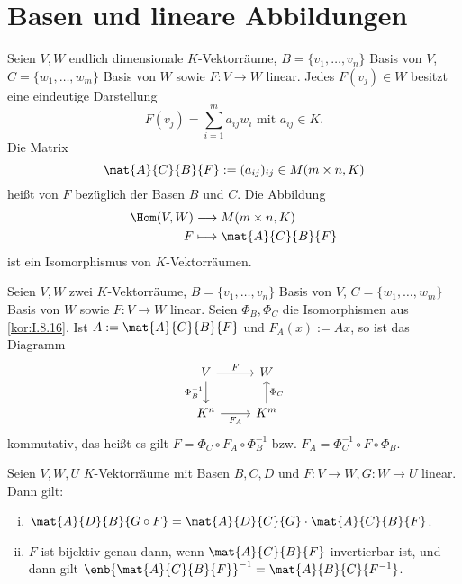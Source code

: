 \section{Basen und lineare Abbildungen}

\begin{satz}[Darstellungsmatrix]
	\label{satz:I.10.1}
	Seien $V,W$ endlich dimensionale $K$-Vektorräume, $B = \{v_1,\dots,v_n\}$ Basis von $V$, $C = \{w_1,\dots,w_m\}$ Basis von $W$ sowie $F \colon V \rightarrow W$ linear.
	Jedes $F(v_j) \in W$ besitzt eine eindeutige Darstellung
	\[
		F(v_j) = \sum_{i=1}^{m} a_{ij} w_i \text{ mit } a_{ij} \in K.
	\]
	Die Matrix
	\[
		\mat{A}{C}{B}{F} := (a_{ij})_{ij} \in M(m\times n,K)
	\]
	heißt  von $F$ bezüglich der Basen $B$ und $C$.
	Die Abbildung
	\begin{align*}
		\Hom(V,W) &\longrightarrow M(m \times n,K) \\
		F &\longmapsto \mat{A}{C}{B}{F}
	\end{align*}
	ist ein Isomorphismus von $K$-Vektorräumen.
\end{satz}

\setcounter{definition}{2}
\begin{lemma}
	\label{lemma:I.10.3}
	Seien $V,W$ zwei $K$-Vektorräume, $B = \{v_1,\dots,v_n\}$ Basis von $V$, $C = \{w_1,\dots,w_m\}$ Basis von $W$ sowie $F \colon V \rightarrow W$ linear.
	Seien $\Phi_B, \Phi_C$ die Isomorphismen aus \autoref{kor:I.8.16}.
	Ist $A := \mat{A}{C}{B}{F}$ und $F_A(x) := Ax$, so ist das Diagramm
	\[
		\begin{tikzcd}
			V \arrow[r,"F"] \arrow[d,"\Phi_B^{-1}"'] & W \\
			K^n \arrow[r,"F_A"'] & K^m \arrow[u,"\Phi_C"']
		\end{tikzcd}
	\]
	kommutativ, das heißt es gilt $F = \Phi_C \circ F_A \circ \Phi_B^{-1}$ bzw. $F_A = \Phi_C^{-1} \circ F \circ \Phi_B$.
\end{lemma}

\begin{satz}
	\label{satz:I.10.4}
	Seien $V,W,U$ $K$-Vektorräume mit Basen $B,C,D$ und $F\colon V \rightarrow W, G \colon W \rightarrow U$ linear.
	Dann gilt:
	\begin{enumerate}[(i)]
		\item	$\mat{A}{D}{B}{G \circ F} = \mat{A}{D}{C}{G} \cdot \mat{A}{C}{B}{F}$.
		\item $F$ ist bijektiv genau dann, wenn $\mat{A}{C}{B}{F}$ invertierbar ist, und dann gilt $\enb{\mat{A}{C}{B}{F}}^{-1} = \mat{A}{B}{C}{F^{-1}}$.
	\end{enumerate}
\end{satz}

